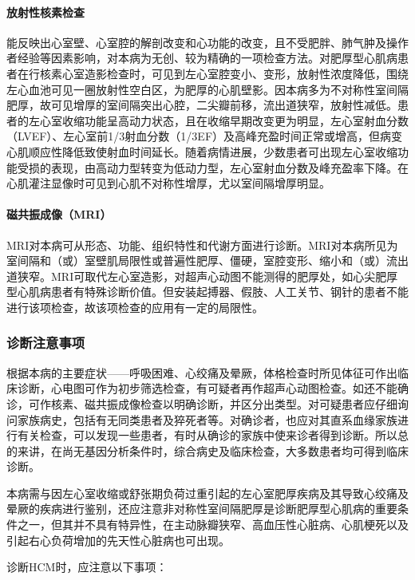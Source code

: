 \paragraph{放射性核素检查}

能反映出心室壁、心室腔的解剖改变和心功能的改变，且不受肥胖、肺气肿及操作者经验等因素影响，对本病为无创、较为精确的一项检查方法。对肥厚型心肌病患者在行核素心室造影检查时，可见到左心室腔变小、变形，放射性浓度降低，围绕左心血池可见一圈放射性空白区，为肥厚的心肌壁影。因本病多为不对称性室间隔肥厚，故可见增厚的室间隔突出心腔，二尖瓣前移，流出道狭窄，放射性减低。患者的左心室收缩功能呈高动力状态，且在收缩早期改变更为明显，左心室射血分数（LVEF）、左心室前1/3射血分数（1/3EF）及高峰充盈时间正常或增高，但病变心肌顺应性降低致使射血时间延长。随着病情进展，少数患者可出现左心室收缩功能受损的表现，由高动力型转变为低动力型，左心室射血分数及峰充盈率下降。在心肌灌注显像时可见到心肌不对称性增厚，尤以室间隔增厚明显。

\paragraph{磁共振成像（MRI）}

MRI对本病可从形态、功能、组织特性和代谢方面进行诊断。MRI对本病所见为室间隔和（或）室壁肌局限性或普遍性肥厚、僵硬，室腔变形、缩小和（或）流出道狭窄。MRI可取代左心室造影，对超声心动图不能测得的肥厚处，如心尖肥厚型心肌病患者有特殊诊断价值。但安装起搏器、假肢、人工关节、钢针的患者不能进行该项检查，故该项检查的应用有一定的局限性。

\subsubsection{诊断注意事项}

根据本病的主要症状------呼吸困难、心绞痛及晕厥，体格检查时所见体征可作出临床诊断，心电图可作为初步筛选检查，有可疑者再作超声心动图检查。如还不能确诊，可作核素、磁共振成像检查以明确诊断，并区分出类型。对可疑患者应仔细询问家族病史，包括有无同类患者及猝死者等。对确诊者，也应对其直系血缘家族进行有关检查，可以发现一些患者，有时从确诊的家族中使来诊者得到诊断。所以总的来讲，在尚无基因分析条件时，综合病史及临床检查，大多数患者均可得到临床诊断。

本病需与因左心室收缩或舒张期负荷过重引起的左心室肥厚疾病及其导致心绞痛及晕厥的疾病进行鉴别，还应注意非对称性室间隔肥厚是诊断肥厚型心肌病的重要条件之一，但其并不具有特异性，在主动脉瓣狭窄、高血压性心脏病、心肌梗死以及引起右心负荷增加的先天性心脏病也可出现。

诊断HCM时，应注意以下事项：

